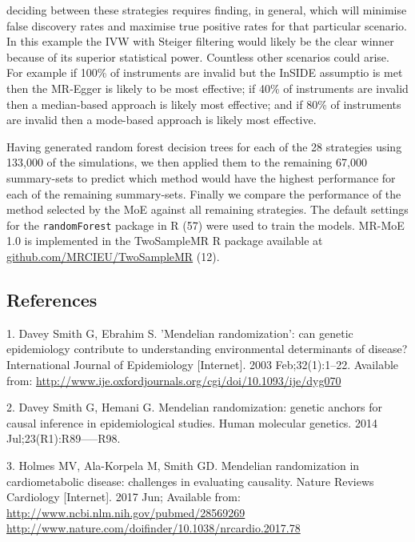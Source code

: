 \documentclass[]{article}
\begin{document}
deciding between these strategies requires finding, in general, which
will minimise false discovery rates and maximise true positive rates for
that particular scenario. In this example the IVW with Steiger filtering
would likely be the clear winner because of its superior statistical
power. Countless other scenarios could arise. For example if 100\% of
instruments are invalid but the InSIDE assumptio is met then the
MR-Egger is likely to be most effective; if 40\% of instruments are
invalid then a median-based approach is likely most effective; and if
80\% of instruments are invalid then a mode-based approach is likely
most effective.

Having generated random forest decision trees for each of the 28
strategies using 133,000 of the simulations, we then applied them to the
remaining 67,000 summary-sets to predict which method would have the
highest performance for each of the remaining summary-sets. Finally we
compare the performance of the method selected by the MoE against all
remaining strategies. The default settings for the \texttt{randomForest}
package in R (57) were used to train the models. MR-MoE 1.0 is
implemented in the TwoSampleMR R package available at
\href{https://github.com/MRCIEU/TwoSampleMR}{github.com/MRCIEU/TwoSampleMR}
(12).

\subsection{References}\label{references}

\raggedright

\hypertarget{refs}{}
\hypertarget{ref-DaveySmith2003}{}
1. Davey Smith G, Ebrahim S. 'Mendelian randomization': can genetic
epidemiology contribute to understanding environmental determinants of
disease? International Journal of Epidemiology {[}Internet{]}. 2003
Feb;32(1):1--22. Available from:
\url{http://www.ije.oxfordjournals.org/cgi/doi/10.1093/ije/dyg070}

\hypertarget{ref-DaveySmithHemani2014}{}
2. Davey Smith G, Hemani G. Mendelian randomization: genetic anchors for
causal inference in epidemiological studies. Human molecular genetics.
2014 Jul;23(R1):R89-----R98.

\hypertarget{ref-Holmes2017}{}
3. Holmes MV, Ala-Korpela M, Smith GD. Mendelian randomization in
cardiometabolic disease: challenges in evaluating causality. Nature
Reviews Cardiology {[}Internet{]}. 2017 Jun; Available from:
\href{http://www.ncbi.nlm.nih.gov/pubmed/28569269\%20http://www.nature.com/doifinder/10.1038/nrcardio.2017.78}{http://www.ncbi.nlm.nih.gov/pubmed/28569269 http://www.nature.com/doifinder/10.1038/nrcardio.2017.78}
\end{document}
